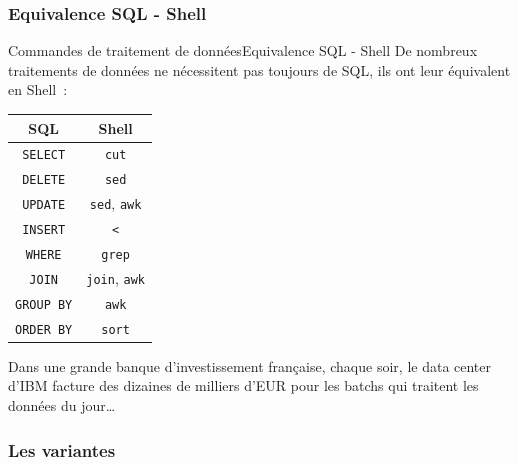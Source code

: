 \documentclass{beamer}
\begin{document}
    \subsubsection{Equivalence SQL - Shell}\label{subsubsec:equi-sql-shell}
    \begin{frame}{Commandes de traitement de données}{Equivalence SQL - Shell}
        De nombreux traitements de données ne nécessitent pas toujours de SQL, ils ont leur équivalent en Shell~:
        \begin{table}[ht]
            \centering
            \begin{tabular}{|c|c|}
                \hline
                \textbf{SQL}         & \textbf{Shell}                   \\
                \hline
                \lstinline{SELECT}   & \lstinline{cut}                  \\
                \hline
                \lstinline{DELETE}   & \lstinline{sed}                  \\
                \hline
                \lstinline{UPDATE}   & \lstinline{sed}, \lstinline{awk} \\
                \hline
                \lstinline{INSERT}   & \lstinline{<}                    \\
                \hline
                \lstinline{WHERE}    & \lstinline{grep}                 \\
                \hline
                \lstinline{JOIN}     & \lstinline{join}, \lstinline{awk}                  \\
                \hline
                \lstinline{GROUP BY} & \lstinline{awk}                  \\
                \hline
                \lstinline{ORDER BY} & \lstinline{sort}                 \\
                \hline
            \end{tabular}
        \end{table}
        Dans une grande banque d'investissement française, chaque soir, le data center d'IBM facture des dizaines de milliers d'EUR pour les batchs qui traitent les données du jour\ldots
    \end{frame}

    \subsubsection{Les variantes}\label{subsubsec:variantes}
\end{document}
